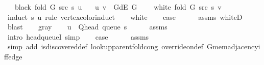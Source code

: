 \begin{isabellebody}
\ \ \ {\isachardoublequoteopen}black\ {\isacharparenleft}{\kern0pt}fold\ G\ src\ s{\isacharparenright}{\kern0pt}\ u{\isachardoublequoteclose}\isanewline
\ \ \ {\isachardoublequoteopen}{\isacharparenleft}{\kern0pt}u{\isacharcomma}{\kern0pt}\ v{\isacharparenright}{\kern0pt}\ {\isasymin}\ G{\isachardot}{\kern0pt}dE\ G{\isachardoublequoteclose}\isanewline
\ \ \ {\isachardoublequoteopen}{\isasymnot}\ white\ {\isacharparenleft}{\kern0pt}fold\ G\ src\ s{\isacharparenright}{\kern0pt}\ v{\isachardoublequoteclose}\isanewline
%
\isadelimproof
%
\endisadelimproof
%
\isatagproof
{}\isamarkupfalse%
\ {\isacharparenleft}{\kern0pt}induct\ s\ u\ rule{\isacharcolon}{\kern0pt}\ vertex{\isacharunderscore}{\kern0pt}color{\isacharunderscore}{\kern0pt}induct{\isacharparenright}{\kern0pt}\isanewline
\ \ \isamarkupfalse%
\ white\isanewline
\ \ \isamarkupfalse%
\ {\isacharquery}{\kern0pt}case\isanewline
\ \ \ \ \isamarkupfalse%
\ assms{\isacharparenleft}{\kern0pt}{}{\isacharparenright}{\kern0pt}\ whiteD\isanewline
\ \ \ \ \isamarkupfalse%
\ blast\isanewline
{}\isamarkupfalse%
\isanewline
\ \ \isamarkupfalse%
\ gray\isanewline
\ \ \isamarkupfalse%
\ {\isachardoublequoteopen}u\ {\isacharequal}{\kern0pt}\ Q{\isacharunderscore}{\kern0pt}head\ {\isacharparenleft}{\kern0pt}queue\ s{\isacharparenright}{\kern0pt}{\isachardoublequoteclose}\isanewline
\ \ \ \ \isamarkupfalse%
\ assms{\isacharparenleft}{\kern0pt}{}{\isacharparenright}{\kern0pt}\isanewline
\ \ \ \ \isamarkupfalse%
\ {\isacharparenleft}{\kern0pt}intro\ head{\isacharunderscore}{\kern0pt}queueI{\isacharunderscore}{\kern0pt}{}{\isacharparenright}{\kern0pt}\ simp{\isacharplus}{\kern0pt}\isanewline
\ \ \isamarkupfalse%
\ {\isacharquery}{\kern0pt}case\isanewline
\ \ \ \ \isamarkupfalse%
\ assms{\isacharparenleft}{\kern0pt}{}{\isacharparenright}{\kern0pt}\isanewline
\ \ \ \ \isamarkupfalse%
\ {\isacharparenleft}{\kern0pt}simp\ add{\isacharcolon}{\kern0pt}\ is{\isacharunderscore}{\kern0pt}discovered{\isacharunderscore}{\kern0pt}def\ lookup{\isacharunderscore}{\kern0pt}parent{\isacharunderscore}{\kern0pt}fold{\isacharunderscore}{\kern0pt}cong\ override{\isacharunderscore}{\kern0pt}on{\isacharunderscore}{\kern0pt}def\ G{\isachardot}{\kern0pt}mem{\isacharunderscore}{\kern0pt}adjacency{\isacharunderscore}{\kern0pt}iff{\isacharunderscore}{\kern0pt}edge{\isacharparenright}{\kern0pt}\isanewline

\end{isabellebody}
